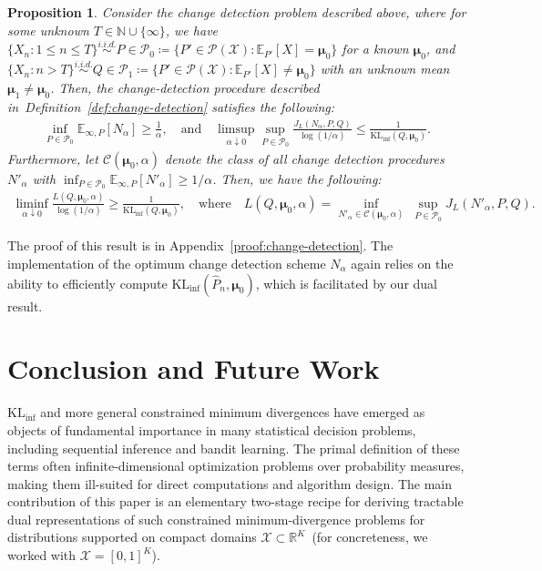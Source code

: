 \documentclass{article}
\theoremstyle{plain}
\newtheorem{proposition}[proposition]{Proposition}
\theoremstyle{definition}
\newcommand{\KLinf}{\operatorname{KL_{inf}}}
\newcommand{\R}{\mathbb{R}}
\newcommand{\calP}{\mathcal P}
\newcommand{\calC}{\mathcal C}
\newcommand{\calX}{\mathcal X}
\newcommand{\qtext}[1]{\quad \text{#1} \quad}
\newcommand{\iid}{i.i.d.\xspace}
\newcommand{\boldmu}{\boldsymbol{\mu}}
\begin{document}
\begin{proposition}
\label{prop:change-detection}    
Consider the change detection problem described above, where for some unknown $T \in \mathbb{N} \cup \{\infty\}$, we have $\{X_n: 1 \leq n \leq T\} \overset{\iid}{\sim} P \in \calP_0 \coloneqq \{P' \in \calP(\calX): \mathbb{E}_{P'}[X] = \boldmu_0\}$ for a known  $\boldmu_0$, and $\{X_n: n > T\} \overset{\iid}{\sim} Q \in \calP_1 \coloneqq \{P' \in \calP(\calX): \mathbb{E}_{P'}[X] \neq \boldmu_0\}$ with an unknown mean $\boldmu_1 \neq \boldmu_0$. 
Then, the change-detection procedure described in~Definition~\ref{def:change-detection} satisfies the following: 
\begin{align}
    \inf_{P \in \calP_0} \mathbb{E}_{\infty, P}[N_\alpha] \geq \frac{1}{\alpha}, \qtext{and} \limsup_{\alpha \downarrow 0}  \sup_{P\in \calP_0}\frac{J_L(N_\alpha, P, Q)}{\log(1/\alpha)} \leq \frac{1}{\KLinf(Q, \boldmu_0)}. 
\end{align}
Furthermore, let $\calC(\boldmu_0, \alpha)$ denote the class of all change detection procedures $N'_\alpha$ with $\inf_{P \in \calP_0} \mathbb{E}_{\infty, P}[N'_\alpha] \geq 1/\alpha$. Then, we have the following: 
\begin{align}
    \liminf_{\alpha \downarrow 0} \frac{L(Q, \boldmu_0, \alpha)}{\log(1/\alpha)} \geq \frac{1}{\KLinf(Q, \boldmu_0)}, \qtext{where} L(Q, \boldmu_0, \alpha) = \inf_{N'_\alpha \in \calC(\boldmu_0, \alpha)} \; \sup_{P\in \calP_0} J_L(N'_\alpha, P, Q). 
\end{align}
\end{proposition}
The proof of this result is in Appendix~\ref{proof:change-detection}. The implementation of the optimum change detection scheme $N_\alpha$ again relies on the ability to efficiently compute $\KLinf(\widehat{P}_n, \boldmu_0)$, which is facilitated by our dual result. 











\section{Conclusion and Future Work}
\label{sec:conclusion}
    $\KLinf$ and more general constrained minimum divergences have emerged as objects of fundamental importance in  many statistical decision problems, including sequential inference and bandit learning.
    The primal definition of these terms often infinite-dimensional optimization problems over probability measures, making them ill-suited for direct computations and algorithm design. 
    The main contribution of this paper is an elementary two-stage recipe for deriving tractable dual representations of such constrained minimum-divergence problems for distributions supported on compact domains $\calX \subset \R^K$~(for concreteness, we worked with $\calX = [0,1]^K$). 
    
\end{document}
